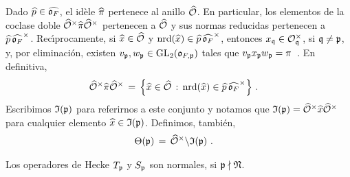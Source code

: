 \begin{obsIdelesDeNormaP}\label{obs:idelesdenormap}
	Dado $\hhat{p}\in\Adfin{\oka{F}}$, el id\`{e}le $\hhat{\pi}$ pertenece
	al anillo $\Adfin{\cal{O}}$. En particular, los elementos de la coclase
	doble $\Idfin{\cal{O}}\hhat{\pi}\Idfin{\cal{O}}$ pertenecen a
	$\Adfin{\cal{O}}$ y sus normas reducidas pertenecen a
	$\hhat{p}\,\Idfin{\oka{F}}$.
	Rec\'{\i}procamente, si $\hhat{x}\in\Adfin{\cal{O}}$
	y $\nrd(\hhat{x})\in\hhat{p}\,\Idfin{\oka{F}}$, entonces
	$x_{\frak{q}}\in\cal{O}_{\frak{q}}^{\times}$, si
	$\frak{q}\not=\frak{p}$, y, por eliminaci\'{o}n, existen
	$v_{\frak{p}},w_{\frak{p}}\in\GL_{2}(\oka{F,\frak{p}})$ tales que
	\begin{math}
		v_{\frak{p}}x_{\frak{p}}w_{\frak{p}}=\pi
	\end{math}~.
	En definitiva,
	\begin{align*}
		\Idfin{\cal{O}}\hhat{\pi}\Idfin{\cal{O}} & \,=\,
			\Big\{\hhat{x}\in\Adfin{\cal{O}}\,:\,
				\nrd(\hhat{x})\in\hhat{p}\,\Idfin{\oka{F}}
			\Big\}
		\text{ .}
	\end{align*}
	Escribimos $\frak{I}(\frak{p})$ para referirnos a este
	conjunto y notamos que
	\begin{math}
		\frak{I}(\frak{p})=\Idfin{\cal{O}}\hhat{x}\Idfin{\cal{O}}
	\end{math}
	para cualquier elemento $\hhat{x}\in\frak{I}(\frak{p})$. Definimos,
	tambi\'{e}n,
	\begin{align*}
		\Theta(\frak{p}) & \,=\,
			\Idfin{\cal{O}}\backslash\frak{I}(\frak{p})
		\text{ .}
	\end{align*}
\end{obsIdelesDeNormaP}

\begin{propoOperadoresDeHeckeSonNormales}%
	\label{propo:operadoresdeheckesonnormales}
	Los operadores de Hecke $T_{\frak{p}}$ y $S_{\frak{p}}$ son normales,
	si $\frak{p}\nmid\frak{N}$.
\end{propoOperadoresDeHeckeSonNormales}

